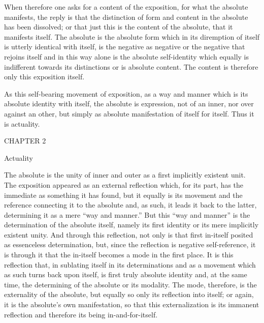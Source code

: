 When therefore one asks for a content of the exposition,
for what the absolute manifests,
the reply is that the distinction of form and content
in the absolute has been dissolved;
or that just this is the content of the absolute,
that it manifests itself.
The absolute is the absolute form
which in its diremption of itself is
utterly identical with itself,
is the negative as negative
or the negative that rejoins itself
and in this way alone is the absolute self-identity
which equally is indifferent towards its distinctions
or is absolute content.
The content is therefore only this exposition itself.

As this self-bearing movement of exposition,
as a way and manner which is
its absolute identity with itself,
the absolute is expression,
not of an inner,
nor over against an other,
but simply as absolute manifestation
of itself for itself.
Thus it is actuality.

CHAPTER 2

Actuality

The absolute is the unity of inner and outer
as a first implicitly existent unit.
The exposition appeared as an external reflection
which, for its part, has the immediate
as something it has found,
but it equally is its movement
and the reference connecting it to the absolute
and, as such, it leads it back to the latter,
determining it as a mere “way and manner.”
But this “way and manner” is the
determination of the absolute itself,
namely its first identity
or its mere implicitly existent unity.
And through this reflection, not only is
that first in-itself posited as essenceless determination,
but, since the reflection is negative self-reference,
it is through it that the in-itself becomes
a mode in the first place.
It is this reflection that,
in sublating itself in its determinations
and as a movement which as such turns back upon itself,
is first truly absolute identity
and, at the same time, the determining of
the absolute or its modality.
The mode, therefore, is the externality of the absolute,
but equally so only its reflection into itself;
or again, it is the absolute's own manifestation,
so that this externalization is its immanent reflection
and therefore its being in-and-for-itself.

